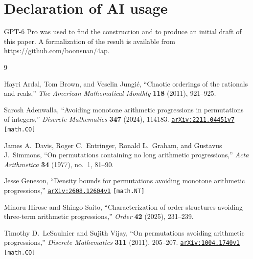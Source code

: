 \documentclass[12pt,reqno]{amsart}
\begin{document}
\section*{Declaration of AI usage}
GPT-6 Pro was used to find the construction and to produce an initial draft
of this paper. A formalization of the result is available from
\url{https://github.com/boonsuan/4ap}. 

\begin{thebibliography}{9}

Hayri Ardal, Tom Brown, and Veselin Jungi\'c, ``Chaotic orderings of the
rationals and reals,'' \textsl{The American Mathematical Monthly} \textbf{118}
(2011), 921--925.

Sarosh Adenwalla, ``Avoiding monotone arithmetic progressions in permutations of
integers,'' \textsl{Discrete Mathematics} \textbf{347} (2024), 114183.
\href{https://arxiv.org/abs/2211.04451}{\texttt{arXiv:2211.04451v7}}
\texttt{[math.CO]}

James A.~Davis, Roger C.~Entringer, Ronald L.~Graham, and Gustavus J.~Simmons,
``On permutations containing no long arithmetic progressions,'' \textsl{Acta
Arithmetica} \textbf{34} (1977), no.~1, 81--90.

Jesse Geneson, ``Density bounds for permutations avoiding monotone arithmetic
progressions,''
\href{https://arxiv.org/abs/2608.12604}{\texttt{arXiv:2608.12604v1}}
\texttt{[math.NT]}

Minoru Hirose and Shingo Saito, ``Characterization of order structures avoiding
three-term arithmetic progressions,'' \textsl{Order} \textbf{42} (2025),
231--239.

Timothy D.~LeSaulnier and Sujith Vijay, ``On permutations avoiding arithmetic
progressions,'' \textsl{Discrete Mathematics} \textbf{311} (2011), 205--207.
\href{https://arxiv.org/abs/1004.1740}{\texttt{arXiv:1004.1740v1}}
\texttt{[math.CO]}

\end{thebibliography}
\end{document}
